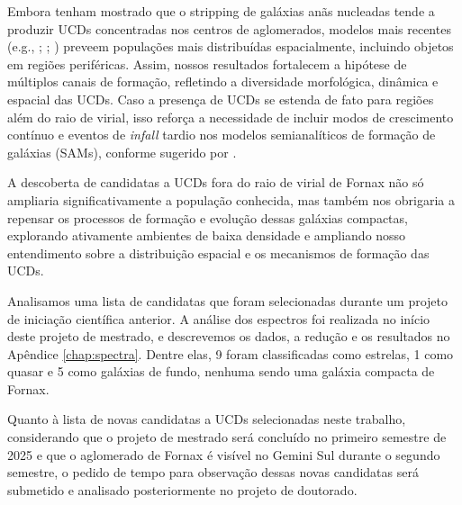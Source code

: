 Embora \citet{Bekki_2001} tenham mostrado que o stripping de galáxias anãs nucleadas tende a produzir UCDs concentradas nos centros de aglomerados, modelos mais recentes (e.g., \citealt{Br_ns_2011}; \citealt{Mieske_2011}; \citealt{Pfeffer_2016}) preveem populações mais distribuídas espacialmente, incluindo objetos em regiões periféricas. Assim, nossos resultados fortalecem a hipótese de múltiplos canais de formação, refletindo a diversidade morfológica, dinâmica e espacial das UCDs. Caso a presença de UCDs se estenda de fato para regiões além do raio de virial, isso reforça a necessidade de incluir modos de crescimento contínuo e eventos de \textit{infall} tardio nos modelos semianalíticos de formação de galáxias (SAMs), conforme sugerido por \citet{Pfeffer_2016}.

A descoberta de candidatas a UCDs fora do raio de virial de Fornax não só ampliaria significativamente a população conhecida, mas também nos obrigaria a repensar os processos de formação e evolução dessas galáxias compactas, explorando ativamente ambientes de baixa densidade e ampliando nosso entendimento sobre a distribuição espacial e os mecanismos de formação das UCDs.

Analisamos uma lista de candidatas que foram selecionadas durante um projeto de iniciação científica anterior. A análise dos espectros foi realizada no início deste projeto de mestrado, e descrevemos os dados, a redução e os resultados no Apêndice \ref{chap:spectra}. Dentre elas, 9 foram classificadas como estrelas, 1 como quasar e 5 como galáxias de fundo, nenhuma sendo uma galáxia compacta de Fornax. 

Quanto à lista de novas candidatas a UCDs selecionadas neste trabalho, considerando que o projeto de mestrado será concluído no primeiro semestre de 2025 e que o aglomerado de Fornax é visível no Gemini Sul durante o segundo semestre, o pedido de tempo para observação dessas novas candidatas será submetido e analisado posteriormente no projeto de doutorado.

